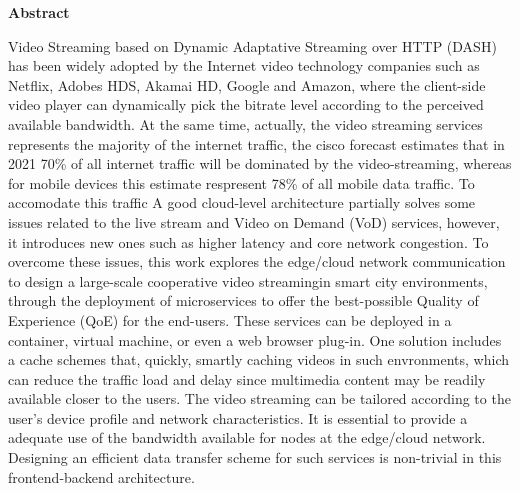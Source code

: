 \begin{center}
	{\bf Abstract}
\end{center}

Video Streaming based on Dynamic Adaptative Streaming over HTTP (DASH) has been widely adopted by the Internet video technology companies such as Netflix, Adobes HDS, Akamai HD, Google and Amazon, where the client-side video player can dynamically pick the bitrate level according to the perceived available bandwidth. 
At the same time, actually, the video streaming services represents the majority of the internet traffic, the cisco forecast estimates that in 2021 70\% of all internet traffic will be dominated by the video-streaming, whereas for mobile devices this estimate respresent 78\% of all mobile data traffic. To accomodate this traffic %
A good cloud-level architecture partially solves some issues related to the live stream and Video on Demand (VoD) services, however, it introduces new ones such as higher latency and core network congestion. 
To overcome these issues, this work explores the edge/cloud network communication to design a large-scale cooperative video streamingin smart city environments, through the deployment of microservices to offer the best-possible Quality of Experience (QoE) for the end-users. These services can be deployed in a container, virtual machine, or even a web browser plug-in. One solution includes a cache schemes that, quickly, smartly caching videos in such envronments, which can reduce the traffic load and delay since multimedia content may be readily available closer to the users. The video streaming can be tailored according to the user's device profile and network characteristics. It is essential to provide a adequate use of the bandwidth available for nodes at the edge/cloud network.%
Designing an efficient data transfer scheme for such services is non-trivial in this frontend-backend architecture.
